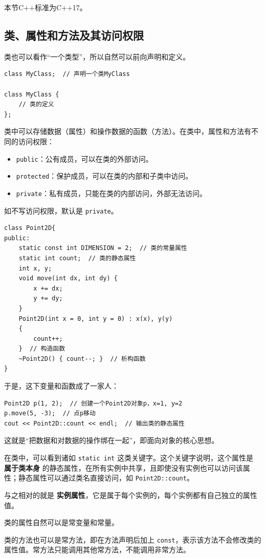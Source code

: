 本节C++标准为C++17。

\subsection{类、属性和方法及其访问权限}

类也可以看作“一个类型”，所以自然可以前向声明和定义。
\begin{verbatim}
class MyClass;  // 声明一个类MyClass

class MyClass {
    // 类的定义
};
\end{verbatim}

类中可以存储数据（属性）和操作数据的函数（方法）。在类中，属性和方法有不同的访问权限：
\begin{itemize}
    \item \verb|public|：公有成员，可以在类的外部访问。
    \item \verb|protected|：保护成员，可以在类的内部和子类中访问。
    \item \verb|private|：私有成员，只能在类的内部访问，外部无法访问。
\end{itemize}
如不写访问权限，默认是 \verb|private|。

\begin{verbatim}
class Point2D{
public:
    static const int DIMENSION = 2;  // 类的常量属性
    static int count;  // 类的静态属性
    int x, y;
    void move(int dx, int dy) {
        x += dx;
        y += dy;
    }
    Point2D(int x = 0, int y = 0) : x(x), y(y)
    {
        count++;
    }  // 构造函数
    ~Point2D() { count--; }  // 析构函数
}
\end{verbatim}
于是，这下变量和函数成了一家人：
\begin{verbatim}
Point2D p(1, 2);  // 创建一个Point2D对象p，x=1, y=2
p.move(5, -3);  // 点p移动
cout << Point2D::count << endl;  // 输出类的静态属性
\end{verbatim}
这就是“把数据和对数据的操作绑在一起”，即面向对象的核心思想。

在类中，可以看到诸如 \texttt{static int} 这类关键字。这个关键字说明，这个属性是 \textbf{属于类本身} 的静态属性，在所有实例中共享，且即使没有实例也可以访问该属性；静态属性可以通过类名直接访问，如 \texttt{Point2D::count}。

与之相对的就是 \textbf{实例属性}，它是属于每个实例的，每个实例都有自己独立的属性值。

类的属性自然可以是常变量和常量。

类的方法也可以是常方法，即在方法声明后加上 \verb|const|，表示该方法不会修改类的属性值。常方法只能调用其他常方法，不能调用非常方法。

